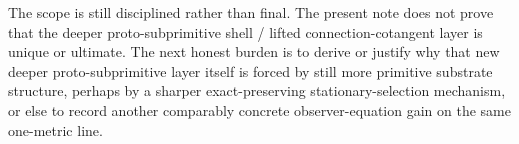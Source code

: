 \documentclass[11pt]{article}
\begin{document}
The scope is still disciplined rather than final. The present note does not prove that the deeper proto-subprimitive shell / lifted connection-cotangent layer is unique or ultimate. The next honest burden is to derive or justify why that new deeper proto-subprimitive layer itself is forced by still more primitive substrate structure, perhaps by a sharper exact-preserving stationary-selection mechanism, or else to record another comparably concrete observer-equation gain on the same one-metric line.
\end{document}
